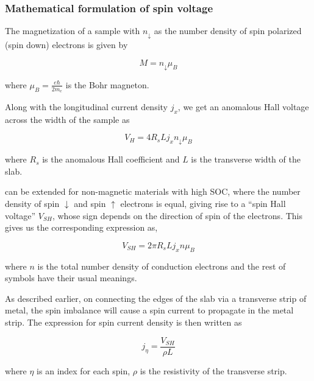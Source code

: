 \subsubsection{Mathematical formulation of spin voltage}

The magnetization of a sample with \( n_{\downarrow} \) as the number density of spin polarized (spin down) electrons is given by

\begin{equation}
    M = n_{\downarrow} \mu_B
\end{equation}

where \( \mu_B = \displaystyle \frac{e \hbar}{2 m_e}\) is the Bohr magneton.

Along with the longitudinal current density \( j_x \), we get an anomalous Hall voltage across the width of the sample as

\begin{equation} \label{eq:ano-hall-voltage}
    V_H = 4 R_s L j_x n_{\downarrow} \mu_B
\end{equation}

where \( R_s \) is the anomalous Hall coefficient and \( L \) is the transverse width of the slab.

 can be extended for non-magnetic materials with high SOC, where the number density of spin \( \downarrow \) and spin \( \uparrow \) electrons is equal, giving rise to a ``spin Hall voltage'' \( V_{SH} \), whose sign depends on the direction of spin of the electrons.
This gives us the corresponding expression as,

\begin{equation} \label{eq:spin-voltage}
    V_{SH} = 2 \pi R_s L j_x n \mu_B
\end{equation}

where \( n \) is the total number density of conduction electrons and the rest of symbols have their usual meanings.

As described earlier, on connecting the edges of the slab via a transverse strip of metal, the spin imbalance will cause a spin current to propagate in the metal strip.
The expression for spin current density is then written as

\begin{equation} \label{eq:j_eta}
    j_\eta = \frac{V_{SH}}{\rho L}
\end{equation}

where \( \eta \) is an index for each spin, \( \rho \) is the resistivity of the transverse strip.

